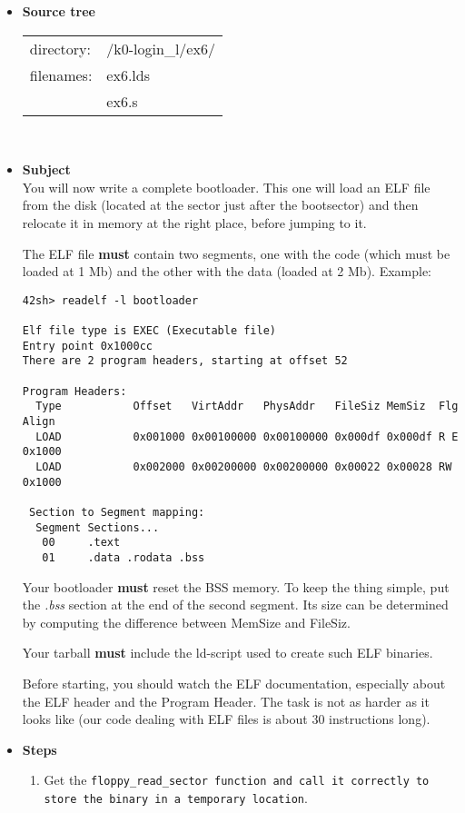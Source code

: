 \begin{itemize}
\item {\bf Source tree}\\
\begin{tabular}{p{4cm}l}
directory: & /k0-login\_l/ex6/\\
filenames: & ex6.lds\\
 & ex6.s
\end{tabular}
\\
\item {\bf Subject}\\
You will now write a complete bootloader. This one will load an ELF
file from the disk (located at the sector just after the bootsector)
and then relocate it in memory at the right place, before jumping to
it.

The ELF file \textbf{must} contain two segments, one with the code (which
must be loaded at 1 Mb) and the other with the data (loaded at 2
Mb). Example:

\begin{verbatim}
42sh> readelf -l bootloader

Elf file type is EXEC (Executable file)
Entry point 0x1000cc
There are 2 program headers, starting at offset 52

Program Headers:
  Type           Offset   VirtAddr   PhysAddr   FileSiz MemSiz  Flg Align
  LOAD           0x001000 0x00100000 0x00100000 0x000df 0x000df R E 0x1000
  LOAD           0x002000 0x00200000 0x00200000 0x00022 0x00028 RW  0x1000

 Section to Segment mapping:
  Segment Sections...
   00     .text
   01     .data .rodata .bss
\end{verbatim}

Your bootloader \textbf{must} reset the BSS memory. To keep the thing
simple, put the \emph{.bss} section at the end of the second
segment. Its size can be determined by computing the difference
between MemSize and FileSiz.

Your tarball \textbf{must} include the ld-script used to create such
ELF binaries.

Before starting, you should watch the ELF documentation, especially
about the ELF header and the Program Header. The task is not as harder
as it looks like (our code dealing with ELF files is about 30
instructions long).\\
\item {\bf Steps}
  \begin{enumerate}

    \item {Get the \tt floppy\_read\_sector \rm function and call it
    correctly to store the binary in a temporary location}.


\end{enumerate}
\end{itemize}
